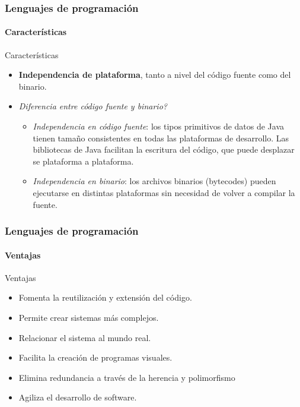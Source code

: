\documentclass{beamer}
\begin{document}
		\begin{frame}
			\frametitle{Lenguajes de programaci\'on}
			\framesubtitle{Caracter\'isticas}

			\begin{exampleblock}{Caracter\'isticas}
				\begin{itemize}
					\item \textbf{Independencia de plataforma}, tanto a nivel del c\'odigo fuente como del binario.
					\item \emph{Diferencia entre c\'odigo fuente y binario?}
					\begin{itemize}
						\item \emph{Independencia en c\'odigo fuente}: los tipos primitivos de datos de Java tienen tama\~no consistentes en todas las plataformas de desarrollo. Las bibliotecas de Java facilitan la escritura del c\'odigo, que puede desplazar se plataforma a plataforma.
						\item \emph{Independencia en binario}: los archivos binarios (bytecodes) pueden ejecutarse en distintas plataformas sin necesidad de volver a compilar la fuente. 
					\end{itemize}
				\end{itemize}
			\end{exampleblock}
		\end{frame}

		\begin{frame}
			\frametitle{Lenguajes de programaci\'on}
			\framesubtitle{Ventajas}

			\begin{exampleblock}{Ventajas}
				\begin{itemize}
					\item Fomenta la reutilizaci\'on y extensi\'on del c\'odigo.
					\item Permite crear sistemas m\'as complejos.
					\item Relacionar el sistema al mundo real.
					\item Facilita la creaci\'on de programas visuales.
					\item Elimina redundancia a trav\'es de la herencia y polimorfismo
					\item Agiliza el desarrollo de software.
				\end{itemize}
			\end{exampleblock}
		\end{frame}
		
\end{document}
